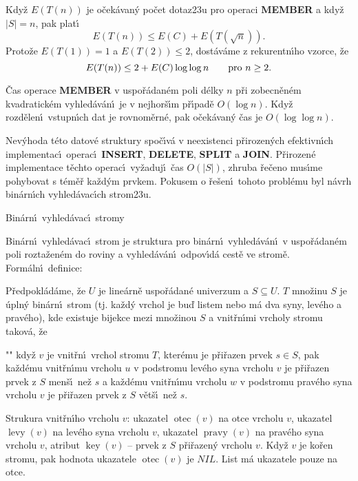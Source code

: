 \documentclass[a4paper,12pt]{article}
\def \emph#1{\underbar{#1}}
\DeclareMathOperator*{\otec}{otec}
\DeclareMathOperator*{\levy}{levy}
\DeclareMathOperator*{\pravy}{pravy}
\DeclareMathOperator*{\key}{key}
\begin{document}
\flushpar Kdy\v z $E(T(n))$ je o\v cek\'avan\'y po\v cet dotaz\accent23u pro operaci 
{\bf MEMBER} a kdy\v z $|S|=n$, pak plat\'\i\ 
$$E(T(n))\le E(C)+E(T(\sqrt n)).$$
Proto\v ze $E(T(1))=1$ a $E(T(2))\le 2$, dost\'av\'ame z rekurentn\'\i ho 
vzorce, \v ze 
$$E(T(n))\le 2+E(C)\log\log n\qquad\text{\rm pro }n\ge 2.$$


\v Cas operace {\bf MEMBER} v uspo\v r\'adan\'em poli d\'elky $
n$ p\v ri 
zobec\-n\v en\'em kvadra\-tick\'em vyhled\'av\'an\'\i\ je v nejhor\v s\'\i m 
p\v r\'\i pa\-d\v e $O(\log n)$. Kdy\v z rozd\v elen\'\i\ vstupn\'\i ch dat je 
rovno\-m\v er\-n\'e, pak o\v cek\'avan\'y \v cas je $O(\log\log n)$. 
\endproclaim

\flushpar Nev\'yhoda t\'eto datov\'e struktury 
spo\v c\'\i v\'a v neexistenci p\v riroze\-n\'ych efektivn\'\i ch implementac\'\i\ 
ope\-rac\'\i\ {\bf INSERT}, {\bf DELETE}, {\bf SPLIT} a {\bf JOIN}. P\v rirozen\'e 
implementace t\v echto ope\-rac\'\i\ vy\v za\-duj\'\i\ \v cas 
$O(|S|)$, zhruba \v re\v ceno mus\'\i me pohybovat s t\'em\v e\v r ka\v z\-d\'ym prvkem. 
Pokusem o \v re\v sen\'\i\ 
tohoto probl\'emu byl n\'avrh bin\'ar\-n\'\i ch vyhled\'avac\'\i ch 
strom\accent23u.
\medskip

\heading 
Bin\'arn\'\i\ vyhled\'avac\'\i\ stromy
\endheading

\flushpar Bin\'arn\'\i\ vyhled\'avac\'\i\ strom je struktura pro bin\'ar\-n\'\i\ 
vyhled\'av\'an\'\i\ v uspo\v r\'ada\-n\'em poli rozta\-\v zen\'em do roviny a 
vyhled\'av\'an\'\i\ odpo\-v\'\i\-d\'a cest\v e ve stro\-m\v e. Form\'aln\'\i\ 
definice:

\flushpar P\v redpokl\'ad\'ame, \v ze $U$ je line\'arn\v e uspo\v r\'adan\'e 
univerzum a $S\subseteq U$.  \emph{Bin\'arn\'\i} \emph{vyhled\'avac\'\i} 
\emph{strom} $T$ \emph{reprezentuj\'\i c\'\i} mno\v zinu $S$ je \'upln\'y 
bin\'arn\'\i\ strom (tj. ka\v zd\'y vrchol je bu\v d listem nebo m\'a 
dva syny, lev\'eho a prav\'eho), kde existuje bijekce mezi 
mno\v zinou $S$ a vnit\v rn\'\i mi vrcholy stromu takov\'a, \v ze
\roster
\item"{}"
kdy\v z $v$ je vnit\v rn\'\i\ vrchol stromu $T$, kter\'emu je p\v ri\v razen 
prvek $s\in S$, pak ka\v zd\'emu vnit\v rn\'\i mu vrcholu $u$ v 
podstromu lev\'eho syna vrcholu $v$ je p\v ri\v razen prvek z $S$ 
men\v s\'\i\ ne\v z $s$ a ka\v zd\'emu vnit\v rn\'\i mu vrcholu $
w$ v 
podstromu prav\'eho syna vrcholu $v$ je p\v ri\v razen prvek z $S$ 
v\v et\v s\'\i\ ne\v z $s$.
\endroster
\medskip

\flushpar Strukura vnit\v rn\'\i ho vrcholu $v$:\newline 
ukazatel $\otec(v)$ na otce vrcholu $v$,\newline 
ukazatel $\levy(v)$ na lev\'eho syna vrcholu $v$,\newline 
ukazatel $\pravy(v)$ na prav\'eho syna vrcholu $v$,\newline 
atribut $\key(v)$ -- prvek z $S$ p\v ri\v razen\'y vrcholu $v$.
Kdy\v z $v$ je ko\v ren stromu, pak hodnota ukazatele $\otec(v)$ 
je $NIL$. List m\'a ukazatele pouze na otce.
\medskip
\end{document}
